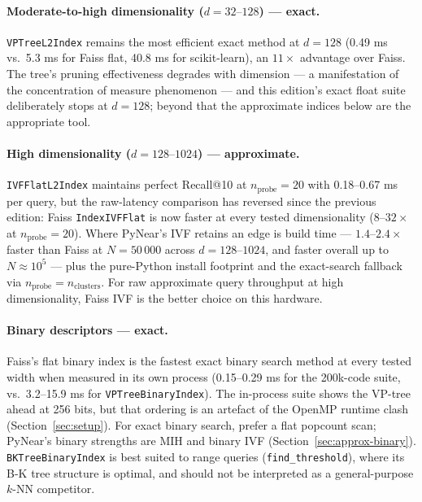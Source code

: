 \documentclass[11pt,a4paper]{article}
\begin{document}
\paragraph{Moderate-to-high dimensionality ($d = 32\text{--}128$) — exact.}
\texttt{VPTreeL2Index} remains the most efficient exact method at $d=128$
(0.49 ms vs.\ 5.3 ms for Faiss flat, 40.8 ms for scikit-learn), an
$11\times$ advantage over Faiss.  The tree's pruning effectiveness
degrades with dimension — a manifestation of the concentration of measure
phenomenon — and this edition's exact float suite deliberately stops at
$d=128$; beyond that the approximate indices below are the appropriate
tool.

\paragraph{High dimensionality ($d = 128\text{--}1024$) — approximate.}
\texttt{IVFFlatL2Index} maintains perfect Recall@10 at
$n_{\mathrm{probe}}=20$ with 0.18--0.67 ms per query, but the raw-latency
comparison has reversed since the previous edition: Faiss
\texttt{IndexIVFFlat} is now faster at every tested dimensionality
($8\text{--}32\times$ at $n_{\mathrm{probe}}=20$).  Where PyNear's IVF
retains an edge is build time — $1.4\text{--}2.4\times$ faster than Faiss
at $N = 50\,000$ across $d=128$--$1024$, and faster overall up to
$N \approx 10^5$ — plus the pure-Python install footprint and the
exact-search fallback via $n_{\mathrm{probe}} = n_{\mathrm{clusters}}$.
For raw approximate query throughput at high dimensionality, Faiss IVF is
the better choice on this hardware.

\paragraph{Binary descriptors — exact.}
Faiss's flat binary index is the fastest exact binary search method at
every tested width when measured in its own process (0.15--0.29 ms for
the 200k-code suite, vs.\ 3.2--15.9 ms for \texttt{VPTreeBinaryIndex}).
The in-process suite shows the VP-tree ahead at 256 bits, but that
ordering is an artefact of the OpenMP runtime clash
(Section~\ref{sec:setup}).  For exact binary search, prefer a flat
popcount scan; PyNear's binary strengths are MIH and binary IVF
(Section~\ref{sec:approx-binary}).
\texttt{BKTreeBinaryIndex} is best suited to range queries
(\texttt{find\_threshold}), where its B-K tree structure is optimal, and
should not be interpreted as a general-purpose $k$-NN competitor.
\end{document}
